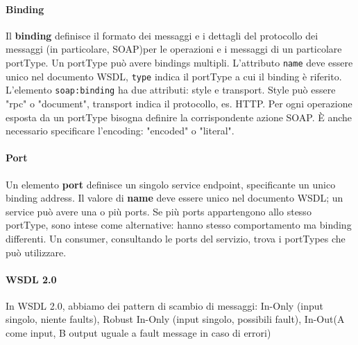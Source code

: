 \documentclass[11pt]{article}
\newcommand{\code}[1]{\texttt{#1}}
\begin{document}
\paragraph{Binding} Il \textbf{binding} definisce il formato dei messaggi e i dettagli del protocollo dei messaggi (in particolare, SOAP)per le operazioni e i messaggi di un particolare portType. Un portType può avere bindings multipli. L'attributo \code{name} deve essere unico nel documento WSDL, \code{type} indica il portType a cui il binding è riferito. L'elemento \code{soap:binding} ha due attributi: style e transport. Style può essere "rpc" o "document", transport indica il protocollo, es. HTTP. Per ogni operazione esposta da un portType bisogna definire la corrispondente azione SOAP. È anche necessario specificare l'encoding: "encoded" o "literal". 
\paragraph{Port} Un elemento \textbf{port} definisce un singolo service endpoint, specificante un unico binding address. Il valore di \textbf{name} deve essere unico nel documento WSDL; un service può avere una o più ports. Se più ports appartengono allo stesso portType, sono intese come alternative: hanno stesso comportamento ma binding differenti. Un consumer, consultando le ports del servizio, trova i portTypes che può utilizzare.
\paragraph{WSDL 2.0} In WSDL 2.0, abbiamo dei pattern di scambio di messaggi: In-Only (input singolo, niente faults), Robust In-Only (input singolo, possibili fault), In-Out(A come input, B output uguale a fault message in caso di errori)
\end{document}
